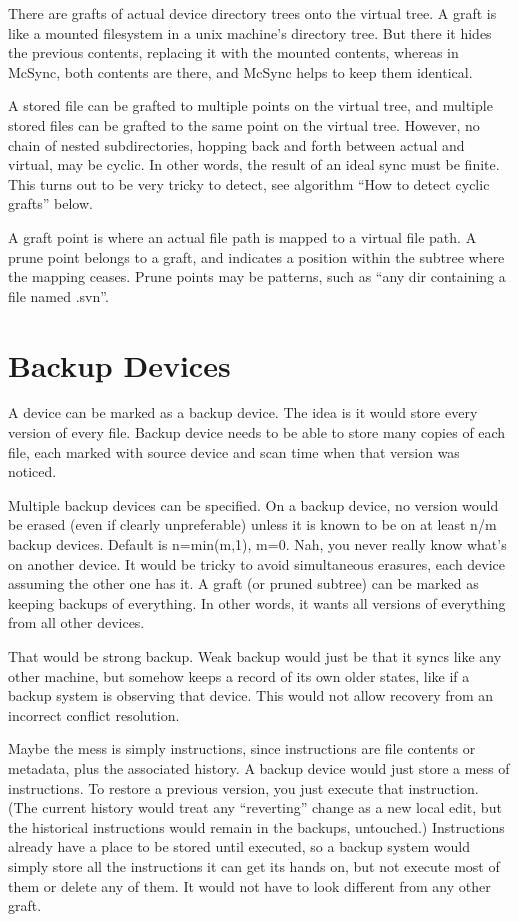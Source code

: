 \documentclass{book}
\begin{document}
There are grafts of actual device directory trees onto the virtual tree.
A graft is like a mounted filesystem in a unix machine's directory tree.  But there it hides the previous contents, replacing it with the mounted contents, whereas in McSync, both contents are there, and McSync helps to keep them identical.

A stored file can be grafted to multiple points on the virtual tree, and multiple stored files can be grafted to the same point on the virtual tree.
However, no chain of nested subdirectories, hopping back and forth between actual and virtual, may be cyclic.  In other words, the result of an ideal sync must be finite.  This turns out to be very tricky to detect, see algorithm ``How to detect cyclic grafts'' below.

A graft point is where an actual file path is mapped to a virtual file path.
A prune point belongs to a graft, and indicates a position within the subtree where the mapping ceases.  Prune points may be patterns, such as ``any dir containing a file named .svn''.


\section{Backup Devices}

A device can be marked as a backup device.  The idea is it would store every version of every file.  Backup device needs to be able to store many copies of each file, each marked with source device and scan time when that version was noticed.

Multiple backup devices can be specified.  On a backup device, no version would be erased (even if clearly unpreferable) unless it is known to be on at least n/m backup devices.  Default is n=min(m,1), m=0.  Nah, you never really know what's on another device.  It would be tricky to avoid simultaneous erasures, each device assuming the other one has it.  A graft (or pruned subtree) can be marked as keeping backups of everything.  In other words, it wants all versions of everything from all other devices.

That would be strong backup.  Weak backup would just be that it syncs like any other machine, but somehow keeps a record of its own older states, like if a backup system is observing that device.  This would not allow recovery from an incorrect conflict resolution.

Maybe the mess is simply instructions, since instructions are file contents or metadata, plus the associated history.  A backup device would just store a mess of instructions.  To restore a previous version, you just execute that instruction.  (The current history would treat any ``reverting'' change as a new local edit, but the historical instructions would remain in the backups, untouched.)  Instructions already have a place to be stored until executed, so a backup system would simply store all the instructions it can get its hands on, but not execute most of them or delete any of them.  It would not have to look different from any other graft.
\end{document}
